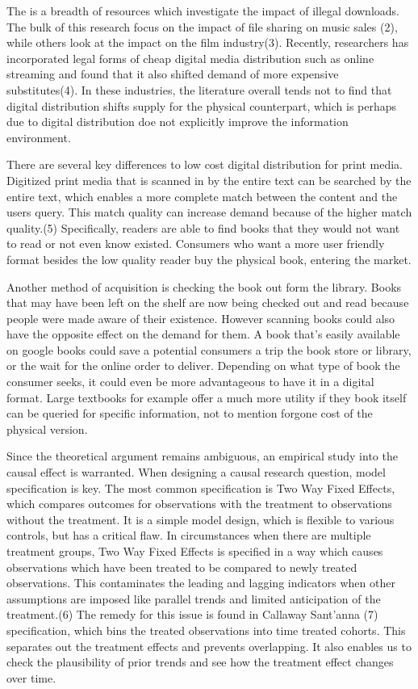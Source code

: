 \documentclass{article}
\begin{document}
The is a breadth of resources which investigate the impact of illegal downloads. The bulk of this research focus on the impact of file sharing on music sales (2), while others look at the impact on the film industry(3). Recently, researchers has incorporated legal forms of cheap digital media distribution such as online streaming and found that it also shifted demand of more expensive substitutes(4). In these industries, the literature overall tends not to find that digital distribution shifts supply for the physical counterpart, which is perhaps due to digital distribution doe not explicitly improve the information environment.

There are several key differences to low cost digital distribution for print media. Digitized print media that is scanned in by the entire text can be searched by the entire text, which enables a more complete match between the content and the users query. This match quality can increase demand because of the higher match quality.(5) Specifically, readers are able to find books that they would not want to read or not even know existed. Consumers who want a more user friendly format besides the low quality reader buy the physical book, entering the market.
 
Another method of acquisition is checking the book out form the library. Books that may have been left on the shelf are now being checked out and read because people were made aware of their existence. However scanning books could also have the opposite effect on the demand for them. A book that’s easily available on google books could save a potential consumers a trip the book store or library, or the wait for the online order to deliver. Depending on what type of book the consumer seeks, it could even be more advantageous to have it in a digital format. Large textbooks for example offer a much more utility if they book itself can be queried for specific information, not to mention forgone cost of the physical version.
  
Since the theoretical argument remains ambiguous, an empirical study into the causal effect is warranted. When designing a causal research question, model specification is key. The most common specification is Two Way Fixed Effects, which compares outcomes for observations with the treatment to observations without the treatment. It is a simple model design, which is flexible to various controls, but has a critical flaw. In circumstances when there are multiple treatment groups, Two Way Fixed Effects is specified in a way which causes observations which have been treated to be compared to newly treated observations. This contaminates the leading and lagging indicators when other assumptions are imposed like parallel trends and limited anticipation of the treatment.(6) The remedy for this issue is found in Callaway Sant'anna (7) specification, which bins the treated observations into time treated cohorts. This separates out the treatment effects and prevents overlapping. It also enables us to check the plausibility of prior trends and see how the treatment effect changes over time.
\end{document}
